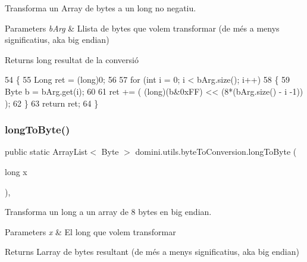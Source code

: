 Transforma un Array de bytes a un long no negatiu. 


\begin{DoxyParams}{Parameters}
{\em b\+Arg} & Llista de bytes que volem transformar (de més a menys significatius, aka big endian) \\
\hline
\end{DoxyParams}
\begin{DoxyReturn}{Returns}
long resultat de la conversió 
\end{DoxyReturn}

\begin{DoxyCode}
54     \{
55         Long ret = (long)0;
56 
57         \textcolor{keywordflow}{for} (\textcolor{keywordtype}{int} i = 0; i < bArg.size(); i++)
58         \{
59             Byte b = bArg.get(i);
60             
61             ret += ( (long)(b&0xFF) << (8*(bArg.size() - i -1)) );
62         \}
63         \textcolor{keywordflow}{return} ret;
64     \}
\end{DoxyCode}
\mbox{\label{classdomini_1_1utils_1_1byteToConversion_ab4466a4c6dd5f6a350953031e99a959d}} 
\subsubsection{\texorpdfstring{long\+To\+Byte()}{longToByte()}}
{\footnotesize\ttfamily public static Array\+List$<$ Byte $>$ domini.\+utils.\+byte\+To\+Conversion.\+long\+To\+Byte (\begin{DoxyParamCaption}\item[{long}]{x }\end{DoxyParamCaption})\hspace{0.3cm}{\ttfamily [inline]}, {\ttfamily [static]}}



Transforma un long a un array de 8 bytes en big endian. 


\begin{DoxyParams}{Parameters}
{\em x} & El long que volem transformar \\
\hline
\end{DoxyParams}
\begin{DoxyReturn}{Returns}
L\textquotesingle{}array de bytes resultant (de més a menys significatius, aka big endian) 
\end{DoxyReturn}

